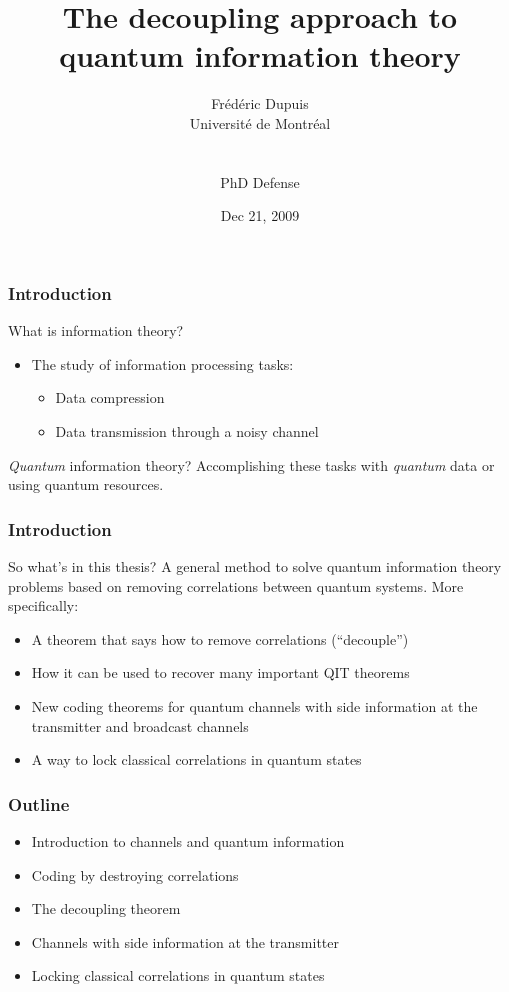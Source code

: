 \documentclass[12pt]{beamer}
\title{The decoupling approach to quantum information theory}
\author[Frédéric Dupuis]{Frédéric Dupuis\\
Université de Montréal\\
\strut\\
PhD Defense}
\date{Dec 21, 2009}
\begin{document}
\begin{frame}
\titlepage
\end{frame}


\begin{frame}
	\frametitle{Introduction}
	What is information theory?
	\begin{itemize}
		\item The study of information processing tasks:
		\begin{itemize}
			\item Data compression
			\item Data transmission through a noisy channel
		\end{itemize}
	\end{itemize}
	\emph{Quantum} information theory? Accomplishing these tasks with \emph{quantum} data or using quantum resources.
\end{frame}

\begin{frame}
	\frametitle{Introduction}
	So what's in this thesis? A general method to solve quantum information theory problems based on removing correlations between quantum systems. More specifically:
	\begin{itemize}
		\item A theorem that says how to remove correlations (``decouple'')
		\item How it can be used to recover many important QIT theorems
		\item New coding theorems for quantum channels with side information at the transmitter and broadcast channels
		\item A way to lock classical correlations in quantum states
	\end{itemize}
\end{frame}

\begin{frame}
	\frametitle{Outline}
	\begin{itemize}
		\item Introduction to channels and quantum information
		\item Coding by destroying correlations
		\item The decoupling theorem
		\item Channels with side information at the transmitter
		\item Locking classical correlations in quantum states
	\end{itemize}
\end{frame}
\end{document}

